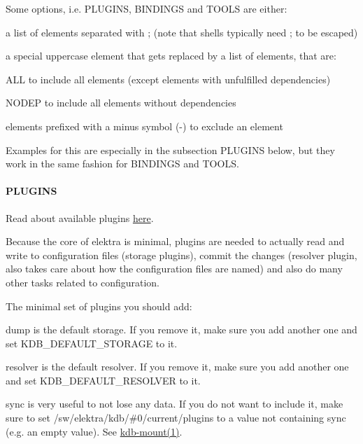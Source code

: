Some options, i.\+e. P\+L\+U\+G\+I\+N\+S, B\+I\+N\+D\+I\+N\+G\+S and T\+O\+O\+L\+S are either\+:


\begin{DoxyItemize}
\item a list of elements separated with ; (note that shells typically need ; to be escaped)
\item a special uppercase element that gets replaced by a list of elements, that are\+:
\begin{DoxyItemize}
\item A\+L\+L to include all elements (except elements with unfulfilled dependencies)
\item N\+O\+D\+E\+P to include all elements without dependencies
\end{DoxyItemize}
\item elements prefixed with a minus symbol (-\/) to exclude an element
\end{DoxyItemize}

Examples for this are especially in the subsection P\+L\+U\+G\+I\+N\+S below, but they work in the same fashion for B\+I\+N\+D\+I\+N\+G\+S and T\+O\+O\+L\+S.

\paragraph*{P\+L\+U\+G\+I\+N\+S}

Read about available plugins \hyperlink{md_src_plugins_README_src_plugins_README_md}{here}.

Because the core of elektra is minimal, plugins are needed to actually read and write to configuration files (storage plugins), commit the changes (resolver plugin, also takes care about how the configuration files are named) and also do many other tasks related to configuration.

The minimal set of plugins you should add\+:
\begin{DoxyItemize}
\item dump is the default storage. If you remove it, make sure you add another one and set {\ttfamily K\+D\+B\+\_\+\+D\+E\+F\+A\+U\+L\+T\+\_\+\+S\+T\+O\+R\+A\+G\+E} to it.
\item resolver is the default resolver. If you remove it, make sure you add another one and set {\ttfamily K\+D\+B\+\_\+\+D\+E\+F\+A\+U\+L\+T\+\_\+\+R\+E\+S\+O\+L\+V\+E\+R} to it.
\item sync is very useful to not lose any data. If you do not want to include it, make sure to set {\ttfamily /sw/elektra/kdb/\#0/current/plugins} to a value not containing sync (e.\+g. an empty value). See \hyperlink{md_doc_help_kdb-mount_doc_help_kdb-mount_md}{kdb-\/mount(1)}.
\end{DoxyItemize}

